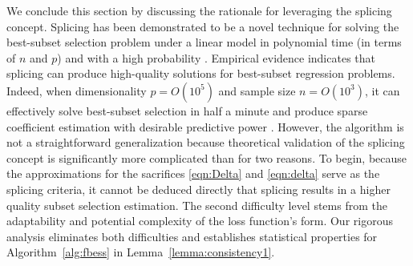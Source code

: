 We conclude this section by discussing the rationale for leveraging the splicing concept.
Splicing has been demonstrated to be a novel technique for solving the best-subset selection problem under a linear model in polynomial time (in terms of $n$ and $p$) and with a high probability \citep{zhu2020polynomial}.
Empirical evidence indicates that splicing can produce high-quality solutions for best-subset regression problems. Indeed, when dimensionality $p = O(10^5)$ and sample size $n = O(10^3)$, it can effectively solve best-subset selection in half a minute and produce sparse coefficient estimation with desirable predictive power \citep{zhu-abess-arxiv}.
However, the algorithm is not a straightforward generalization because theoretical validation of the splicing concept is significantly more complicated than \citet{zhu2020polynomial} for two reasons.
To begin, because the approximations for the sacrifices \eqref{eqn:Delta} and \eqref{eqn:delta} serve as the splicing criteria, it cannot be deduced directly that splicing results in a higher quality subset selection estimation. The second difficulty level stems from the adaptability and potential complexity of the loss function's form. Our rigorous analysis eliminates both difficulties and establishes statistical properties for Algorithm~\ref{alg:fbess} in Lemma~\ref{lemma:consistency1}.


